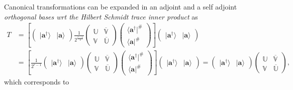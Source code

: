 \documentclass[aps, preprint]{revtex4}
\begin{document}
Canonical transformations can be expanded in an adjoint and a self adjoint \emph{orthogonal
bases wrt the Hilbert Schmidt trace inner product }as
\begin{align}T &  =\left [\left (\begin{array}{cc}\vert \mathbf{a}^{ \dag } \rangle  & \vert \mathbf{a} \rangle \end{array}\right ) \frac{1}{2^{\frac{r -1}{2}}} \left (\begin{array}{cc}\mathbb{U} & \overline{\mathbb{V}} \\
\mathbb{V} & \overline{\mathbb{U}}\end{array}\right ) \left (\begin{array}{c} \langle \mathbf{a}^{ \dag }\vert ^{\#} \\
 \langle \mathbf{a}\vert ^{\#}\end{array}\right )\right ] \left (\begin{array}{cc}\vert \mathbf{a}^{ \dag } \rangle  & \vert \mathbf{a} \rangle \end{array}\right ) \\
 &  =\left [\frac{1}{2^{r -1}} \left (\begin{array}{cc}\vert \mathbf{a}^{ \dag } \rangle  & \vert \mathbf{a} \rangle \end{array}\right ) \left (\begin{array}{cc}\mathbb{U} & \overline{\mathbb{V}} \\
\mathbb{V} & \overline{\mathbb{U}}\end{array}\right ) \left (\begin{array}{c} \langle \mathbf{a}^{ \dag }\vert ^{\#} \\
 \langle \mathbf{a}\vert ^{\#}\end{array}\right )\right ] \left (\begin{array}{cc}\vert \mathbf{a}^{ \dag } \rangle  & \vert \mathbf{a} \rangle \end{array}\right ) =\left (\begin{array}{cc}\vert \mathbf{a}^{ \dag } \rangle  & \vert \mathbf{a} \rangle \end{array}\right ) \left (\begin{array}{cc}\mathbb{U} & \overline{\mathbb{V}} \\
\mathbb{V} & \overline{\mathbb{U}}\end{array}\right )\text{,}\end{align}which corresponds to
\end{document}
